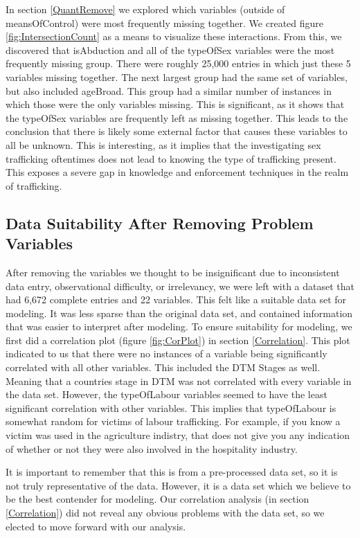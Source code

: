 \documentclass{article} %
\begin{document}
	In section \ref{QuantRemove} we explored which variables (outside of meansOfControl) were most frequently missing together. We created figure \ref{fig:IntersectionCount} as a means to visualize these interactions. From this, we discovered that isAbduction and all of the typeOfSex variables were the most frequently missing group. There were roughly 25,000 entries in which just these 5 variables missing together. The next largest group had the same set of variables, but also included ageBroad. This group had a similar number of instances in which those were the only variables missing. This is significant, as it shows that the typeOfSex variables are frequently left as missing together. This leads to the conclusion that there is likely some external factor that causes these variables to all be unknown. This is interesting, as it implies that the investigating sex trafficking oftentimes does not lead to knowing the type of trafficking present. This exposes a severe gap in knowledge and enforcement techniques in the realm of trafficking.
	
	\subsection{Data Suitability After Removing Problem Variables}
	
	After removing the variables we thought to be insignificant due to inconsistent data entry, observational difficulty, or irrelevancy, we were left with a dataset that had 6,672 complete entries and 22 variables. This felt like a suitable data set for modeling. It was less sparse than the original data set, and contained information that was easier to interpret after modeling. To ensure suitability for modeling, we first did a correlation plot (figure \ref{fig:CorPlot}) in section \ref{Correlation}. This plot indicated to us that there were no instances of a variable being significantly correlated with all other variables. This included the DTM Stages as well. Meaning that a countries stage in DTM was not correlated with every variable in the data set. However, the typeOfLabour variables seemed to have the least significant correlation with other variables. This implies that typeOfLabour is somewhat random for victims of labour trafficking. For example, if you know a victim was used in the agriculture indistry, that does not give you any indication of whether or not they were also involved in the hospitality industry.
	
	It is important to remember that this is from a pre-processed data set, so it is not truly representative of the data. However, it is a data set which we believe to be the best contender for modeling. Our correlation analysis (in section \ref{Correlation}) did not reveal any obvious problems with the data set, so we elected to move forward with our analysis.
	
\end{document}
